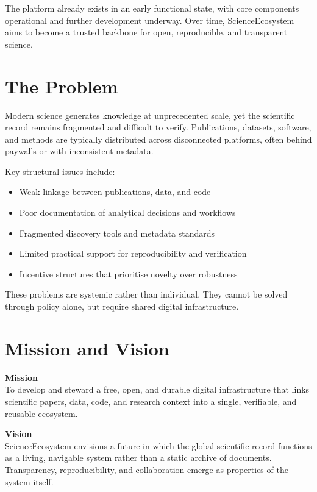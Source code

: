 \documentclass[11pt,a4paper]{article}
\begin{document}
The platform already exists in an early functional state, with core components operational and further development underway. Over time, ScienceEcosystem aims to become a trusted backbone for open, reproducible, and transparent science.

\section{The Problem}

Modern science generates knowledge at unprecedented scale, yet the scientific record remains fragmented and difficult to verify. Publications, datasets, software, and methods are typically distributed across disconnected platforms, often behind paywalls or with inconsistent metadata.

Key structural issues include:
\begin{itemize}
    \item Weak linkage between publications, data, and code
    \item Poor documentation of analytical decisions and workflows
    \item Fragmented discovery tools and metadata standards
    \item Limited practical support for reproducibility and verification
    \item Incentive structures that prioritise novelty over robustness
\end{itemize}

These problems are systemic rather than individual. They cannot be solved through policy alone, but require shared digital infrastructure.

\section{Mission and Vision}

\textbf{Mission}\\
To develop and steward a free, open, and durable digital infrastructure that links scientific papers, data, code, and research context into a single, verifiable, and reusable ecosystem.

\textbf{Vision}\\
ScienceEcosystem envisions a future in which the global scientific record functions as a living, navigable system rather than a static archive of documents. Transparency, reproducibility, and collaboration emerge as properties of the system itself.
\end{document}
